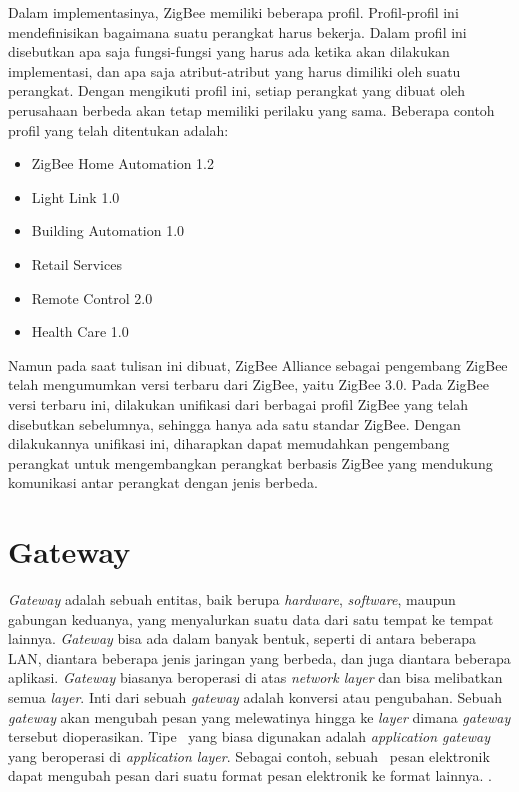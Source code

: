 Dalam implementasinya, ZigBee memiliki beberapa profil. Profil-profil ini mendefinisikan bagaimana suatu perangkat harus bekerja. Dalam profil ini disebutkan apa saja fungsi-fungsi yang harus ada ketika akan dilakukan implementasi, dan apa saja atribut-atribut yang harus dimiliki oleh suatu perangkat. Dengan mengikuti profil ini, setiap perangkat yang dibuat oleh perusahaan berbeda akan tetap memiliki perilaku yang sama. Beberapa contoh profil yang telah ditentukan adalah:
\begin{itemize}
	\item ZigBee Home Automation 1.2
	\item Light Link 1.0
	\item Building Automation 1.0
	\item Retail Services
	\item Remote Control 2.0
	\item Health Care 1.0
\end{itemize}
Namun pada saat tulisan ini dibuat, ZigBee Alliance sebagai pengembang ZigBee telah mengumumkan versi terbaru dari ZigBee, yaitu ZigBee 3.0. Pada ZigBee versi terbaru ini, dilakukan unifikasi dari berbagai profil ZigBee yang telah disebutkan sebelumnya, sehingga hanya ada satu standar ZigBee. Dengan dilakukannya unifikasi ini, diharapkan dapat memudahkan pengembang perangkat untuk mengembangkan perangkat berbasis ZigBee yang mendukung komunikasi antar perangkat dengan jenis berbeda.

\section{Gateway}
\textit{Gateway} adalah sebuah entitas, baik berupa \textit{hardware}, \textit{software}, maupun gabungan keduanya, yang menyalurkan suatu data dari satu tempat ke tempat lainnya. \textit{Gateway} bisa ada dalam banyak bentuk, seperti di antara beberapa LAN, diantara beberapa jenis jaringan yang berbeda, dan juga diantara beberapa aplikasi. \textit{Gateway} biasanya beroperasi di atas \textit{network layer} dan bisa melibatkan semua \textit{layer}. Inti dari sebuah \textit{gateway} adalah konversi atau pengubahan. Sebuah \textit{gateway} akan mengubah pesan yang melewatinya hingga ke \textit{layer} dimana \textit{gateway} tersebut dioperasikan. Tipe \gateway~yang biasa digunakan adalah \textit{application gateway} yang beroperasi di \textit{application layer}. Sebagai contoh, sebuah \gateway~pesan elektronik dapat mengubah pesan dari suatu format pesan elektronik ke format lainnya. \cite{GatewayIbmRedbooks}.


